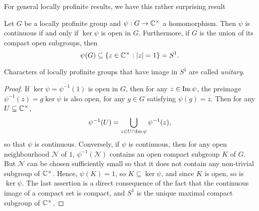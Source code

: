 For general locally profinite results, we have this rather surprising result
\begin{lemma}\label{lem_cont_chars}
    Let $G$ be a locally profinite group and $\psi: G\rightarrow\mathbb{C}^{\times}$ a homomorphism. Then $\psi$ is continuous if and only if $\ker\psi$ is open in $G$. Furthermore, if $G$ is the union of its compact open subgroups, then $$\psi(G)\subseteq\{z\in\mathbb{C}^{\times}:|z|=1\}=S^1.$$
\end{lemma}
\begin{rem}
    Characters of locally profinite groups that have image in $S^1$ are called \textit{unitary}.
\end{rem}
\begin{proof}
    If $\ker\psi=\psi^{-1}(1)$ is open in $G$, then for any $z\in\operatorname{Im}\psi$, the preimage $\psi^{-1}(z)=g\ker\psi$ is also open, for any $g \in G$ satisfying $\psi(g)=z$. Then for any $U\subseteq\mathbb{C}^{\times}$, 
    $$\psi^{-1}(U)=\bigcup_{z\in U\cap\operatorname{Im}\psi}\psi^{-1}(z),$$
    so that $\psi$ is continuous.
    Conversely, if $\psi$ is continuous, then for any open neighbourhood $\mathcal{N}$ of $1$, $\psi^{-1}(\mathcal{N})$ contains an open compact subgroup $K$ of $G$. But $\mathcal{N}$ can be chosen sufficiently small so that it does not contain any non-trivial subgroup of $\mathbb{C}^{\times}$. Hence, $\psi(K)=1$, so $K\subseteq\ker\psi$, and since $K$ is open, so is $\ker\psi$.
    The last assertion is a direct consequence of the fact that the continuous image of a compact set is compact, and $S^1$ is the unique maximal compact subgroup of $\mathbb{C}^{\times}$.
\end{proof}

